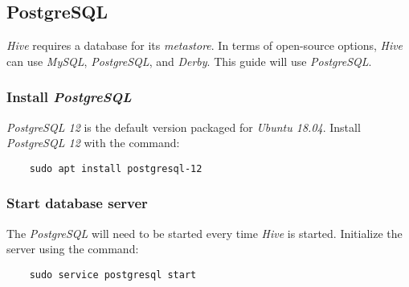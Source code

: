 \documentclass{article}
\begin{document}
  \subsection{PostgreSQL}
  \label{subsec:postgres}
  \emph{Hive} requires a database for its \emph{metastore}. In terms of open-source options, \emph{Hive} can use
  \emph{MySQL}, \emph{PostgreSQL}, and \emph{Derby}. This guide will use \emph{PostgreSQL}.

    \subsubsection{Install \emph{PostgreSQL}}
    \emph{PostgreSQL 12} is the default version packaged for \emph{Ubuntu 18.04}. Install
    \emph{PostgreSQL 12} with the command:
    \begin{verbatim}
    sudo apt install postgresql-12
    \end{verbatim}

    \subsubsection{Start database server}
    \label{subsec:pgsstart}
    The \emph{PostgreSQL} will need to be started every time \emph{Hive} is started. Initialize the
    server using the command:
    \begin{verbatim}
    sudo service postgresql start
    \end{verbatim}
\end{document}
